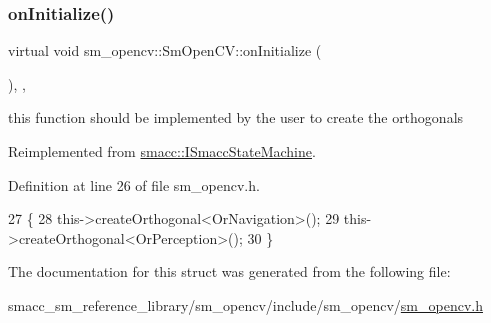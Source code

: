 \subsubsection{\texorpdfstring{on\+Initialize()}{onInitialize()}}
{\footnotesize\ttfamily virtual void sm\+\_\+opencv\+::\+Sm\+Open\+C\+V\+::on\+Initialize (\begin{DoxyParamCaption}{ }\end{DoxyParamCaption})\hspace{0.3cm}{\ttfamily [inline]}, {\ttfamily [override]}, {\ttfamily [virtual]}}



this function should be implemented by the user to create the orthogonals 



Reimplemented from \hyperlink{classsmacc_1_1ISmaccStateMachine_ac2982c6c8283663e5e1e8a7c82f511ec}{smacc\+::\+I\+Smacc\+State\+Machine}.



Definition at line 26 of file sm\+\_\+opencv.\+h.


\begin{DoxyCode}
27     \{
28         this->createOrthogonal<OrNavigation>();
29         this->createOrthogonal<OrPerception>();
30     \}
\end{DoxyCode}


The documentation for this struct was generated from the following file\+:\begin{DoxyCompactItemize}
\item 
smacc\+\_\+sm\+\_\+reference\+\_\+library/sm\+\_\+opencv/include/sm\+\_\+opencv/\hyperlink{sm__opencv_8h}{sm\+\_\+opencv.\+h}\end{DoxyCompactItemize}
